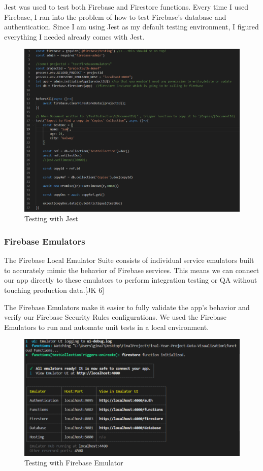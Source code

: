 \vspace{5mm}

Jest was used to test both Firebase and Firestore functions.
Every time I used Firebase, I ran into the problem of how to test Firebase's database and authentication. Since I am using Jest as my default testing environment, I figured everything I needed already comes with Jest.

\begin{figure}[ht]
    \centering
    \includegraphics[scale=0.6]{img/jest.PNG}
    \caption{Testing with Jest}
    \label{fig:my_label4}
\end{figure}

\subsubsection{Firebase Emulators}
The Firebase Local Emulator Suite consists of individual service emulators built to accurately mimic the behavior of Firebase services. This means we can connect our app directly to these emulators to perform integration testing or QA without touching production data.[JK 6]

The Firebase Emulators make it easier to fully validate the app's behavior and verify our Firebase Security Rules configurations.
We used the Firebase Emulators to run and automate unit tests in a local environment. 

\begin{figure}[ht]
    \centering
    \includegraphics[scale=0.7]{img/FirebaseEmulator.PNG}
    \caption{Testing with Firebase Emulator}
    \label{fig:my_label4}
\end{figure}

